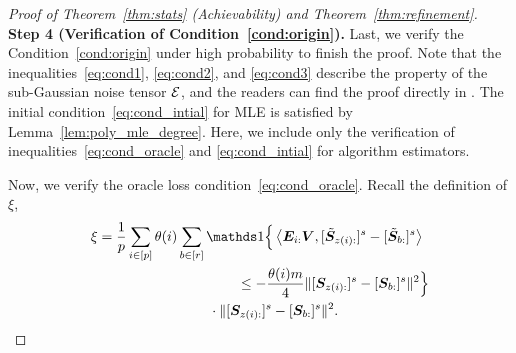 \documentclass[journal]{IEEEtran}
\theoremstyle{definition}
\theoremstyle{definition}
\newcommand{\offf}[1]{\left\{#1\right\}}
\newcommand{\ang}[1]{\left\langle#1\right\rangle}
\begin{document}
\begin{proof}[Proof of Theorem~\ref{thm:stats} (Achievability) and Theorem~\ref{thm:refinement}]
   
    
    {\bf Step 4 (Verification of Condition~\ref{cond:origin}).} Last, we verify the Condition~\ref{cond:origin} under high probability to finish the proof. Note that the inequalities~\eqref{eq:cond1}, \eqref{eq:cond2}, and \eqref{eq:cond3} describe the property of the sub-Gaussian noise tensor $\mathcal{E}$, and the readers can find the proof directly in \cite[Step 5, Proof of Theorem 2]{han2020exact}. The initial condition~\eqref{eq:cond_intial} for MLE is satisfied by Lemma~\ref{lem:poly_mle_degree}. Here, we include only the verification of inequalities~\eqref{eq:cond_oracle} and \eqref{eq:cond_intial} for algorithm estimators. 
    
    Now, we verify the oracle loss condition~\eqref{eq:cond_oracle}. Recall the definition of $\xi$,
    \small
    \begin{align}
        \xi & = \frac{1}{p} \sum_{i \in [p]} \theta(i) \sum_{b \in [r]} \ind \Big\{\ang{ \mE_{i:} \mV, [  \tilde \mS_{z(i):} ]^s - [  \tilde \mS_{b:} ]^s} \\
         & \quad \quad \quad \quad \quad \quad \quad \quad \quad \quad \leq - \frac{ \theta(i) m}{4} \onormSize{}{ [ \mS_{z(i):}  ]^s - [ \mS_{b:}  ]^s  }^2 \Big\} \\
         & \quad \quad \quad \quad \quad \quad \quad \quad \cdot \onormSize{}{ [ \mS_{z(i):}  ]^s - [ \mS_{ b:}  ]^s  }^2.
    \end{align}
    \normalsize


\end{proof}
\end{document}
